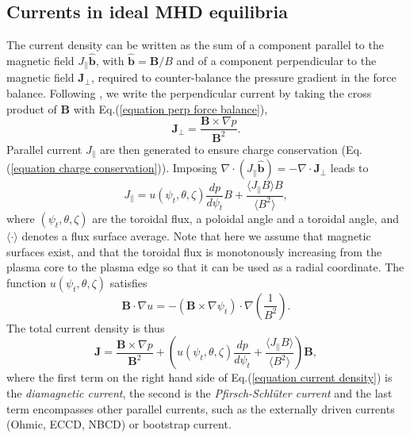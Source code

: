 \documentclass[my_thesis.tex]{subfiles}
\begin{document}
\subsection{Currents in ideal MHD equilibria}\label{sec ideal mhd currents}
The current density can be written as the sum of a component parallel to the magnetic field $J_\parallel \hat{\mathbf{b}}$, with $\hat{\mathbf{b}}=\mathbf{B}/B$ and of a component perpendicular to the magnetic field $\mathbf{J}_\perp$, required to counter-balance the pressure gradient in the force balance. Following \citet{helanderTheoryPlasmaConfinement2014}, we write the perpendicular current by taking the cross product of $\mathbf{B}$ with Eq.(\ref{equation perp force balance}),
\begin{equation}
	\mathbf{J}_\perp = \frac{\mathbf{B}\times\nabla p}{\mathbf{B}^2}.
\end{equation}
Parallel current $J_\parallel$ are then generated to ensure charge conservation (Eq.(\ref{equation charge conservation})). Imposing $\nabla \cdot (J_\parallel\mathbf{\hat{b}}) = - \nabla\cdot\mathbf{J}_\perp$ leads to 
\begin{equation}
	J_\parallel = u(\psi_t,\theta,\zeta)\frac{dp}{d\psi_t}B + \frac{\langle J_\parallel B\rangle B}{\langle B^2\rangle},
\end{equation}
where $(\psi_t,\theta,\zeta)$ are the toroidal flux, a poloidal angle and a toroidal angle, and $\langle\cdot\rangle$ denotes a flux surface average. Note that here we assume that magnetic surfaces exist, and that the toroidal flux is monotonously increasing from the plasma core to the plasma edge so that it can be used as a radial coordinate. The function $u(\psi_t,\theta,\zeta)$ satisfies
\begin{equation}
	\mathbf{B}\cdot\nabla u = -(\mathbf{B}\times\nabla\psi_t)\cdot\nabla\left(\frac{1}{B^2}\right). \label{eq.diff_u}
\end{equation}
The total current density is thus
\begin{equation}
	\mathbf{J} = \frac{\mathbf{B}\times\nabla p}{\mathbf{B}^2} + \left(u(\psi_t,\theta,\zeta)\frac{dp}{d\psi_t} + \frac{\langle J_\parallel B\rangle}{\langle B^2\rangle}\right)\mathbf{B}, \label{equation current density}
\end{equation}
where the first term on the right hand side of Eq.(\ref{equation current density}) is the \emph{diamagnetic current}, the second is the \emph{Pfirsch-Schl\"uter current} and the last term encompasses other parallel currents, such as the externally driven currents (Ohmic, \ac{ECCD}, \ac{NBCD}) or bootstrap current.
\end{document}
